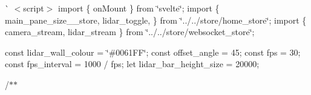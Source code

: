 \`{} $<$script$>$ import \{ on\+Mount \} from \char`\"{}svelte\char`\"{}; import \{ main\+\_\+pane\+\_\+size\+\_\+\_\+store, lidar\+\_\+toggle, \} from \char`\"{}../../store/home\+\_\+store\char`\"{}; import \{ camera\+\_\+stream, lidar\+\_\+stream \} from \char`\"{}../../store/websocket\+\_\+store\char`\"{};

const lidar\+\_\+wall\+\_\+colour = \char`\"{}\#0061\+FF\char`\"{}; const offset\+\_\+angle = 45; const fps = 30; const fps\+\_\+interval = 1000 / fps; let lidar\+\_\+bar\+\_\+height\+\_\+size = 20000;

/$\ast$$\ast$
\begin{DoxyItemize}
\item 
\end{DoxyItemize}